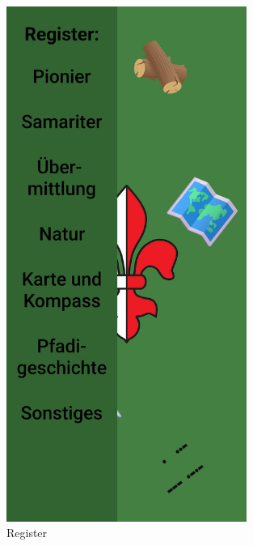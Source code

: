 \begin{figure}[!hp]
\begin{minipage}[b]{0.4\textwidth}
        \includegraphics[width=0.7\textwidth]{Picture/register.jpg}
        \caption{Register}
        \label{fig:register}
    \end{minipage}

    \vspace{0.05\textwidth}
    

\end{figure}

